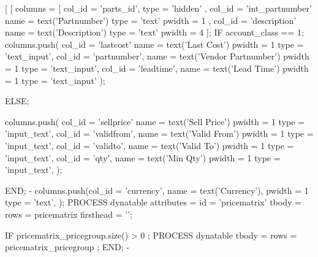 \documentclass[a4paper]{article}
\begin{document}
[%
[%
    columns = [ 
              { col_id = 'parts_id',
                  type = 'hidden' },
              { col_id = 'int_partnumber'
                  name = text('Partnumber')
                  type = 'text'
                pwidth = 1
                },
                { col_id = 'description'
                  name = text('Description')
                  type = 'text'
                pwidth = 4
                } ];
     IF account_class == 1;
         columns.push(
                  {col_id = 'lastcost'
                     name = text('Last Cost') 
                   pwidth = 1
                     type = 'text_input'},
                  {col_id = 'partnumber',
                     name = text('Vendor Partnumber') 
                   pwidth = 1
                     type = 'text_input'},
                  {col_id = 'leadtime',
                     name = text('Lead Time') 
                   pwidth = 1
                     type = 'text_input'}
         );

     ELSE;

         columns.push(
                  {col_id = 'sellprice'
                     name = text('Sell Price') 
                   pwidth = 1
                     type = 'input_text'},
                  {col_id = 'validfrom',
                     name = text('Valid From') 
                   pwidth = 1
                     type = 'input_text'},
                  {col_id = 'validto',
                     name = text('Valid To') 
                   pwidth = 1
                     type = 'input_text'},
                  {col_id = 'qty',
                     name = text('Min Qty') 
                   pwidth = 1
                     type = 'input_text'},
         );
                        
     END;
-%
     columns.push({col_id = 'currency',
                     name = text('Currency'),
                   pwidth = 1
                     type = 'text'},
     );
      PROCESS dynatable
    attributes = { id = 'pricematrix' }
         tbody = { rows = pricematrix }
    firsthead = '';

   IF pricematrix_pricegroup.size() > 0 ;
     PROCESS dynatable
         tbody = { rows = pricematrix_pricegroup };
   END;
-%
\end{document}
